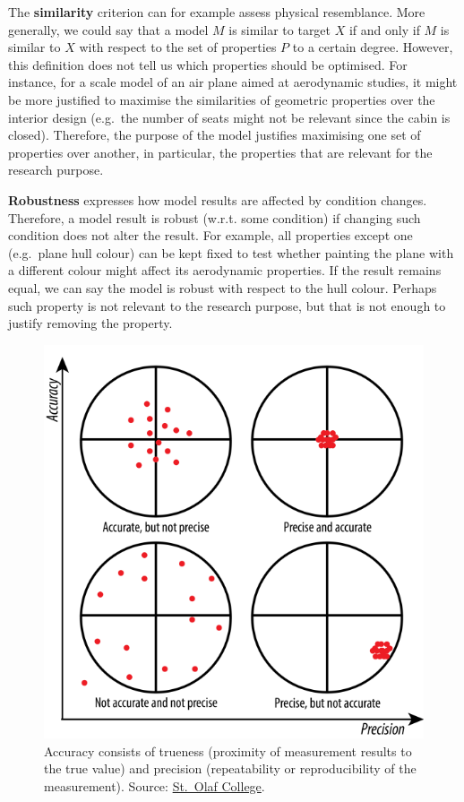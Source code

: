 \documentclass[
]{book}
\begin{document}
The \textbf{similarity} criterion can for example assess physical resemblance. More generally, we could say that a model \(M\) is similar to target \(X\) if and only if \(M\) is similar to \(X\) with respect to the set of properties \(P\) to a certain degree. However, this definition does not tell us which properties should be optimised. For instance, for a scale model of an air plane aimed at aerodynamic studies, it might be more justified to maximise the similarities of geometric properties over the interior design (e.g.~the number of seats might not be relevant since the cabin is closed). Therefore, the purpose of the model justifies maximising one set of properties over another, in particular, the properties that are relevant for the research purpose.

\textbf{Robustness} expresses how model results are affected by condition changes. Therefore, a model result is robust (w.r.t. some condition) if changing such condition does not alter the result. For example, all properties except one (e.g.~plane hull colour) can be kept fixed to test whether painting the plane with a different colour might affect its aerodynamic properties. If the result remains equal, we can say the model is robust with respect to the hull colour. Perhaps such property is not relevant to the research purpose, but that is not enough to justify removing the property.



\begin{figure}

{\centering \includegraphics[width=0.66\linewidth]{Figures/prec_vs_acc} 

}

\caption{Accuracy consists of trueness (proximity of measurement results to the true value) and precision (repeatability or reproducibility of the measurement). Source: \href{https://wp.stolaf.edu/it/gis-precision-accuracy/}{St.~Olaf College}.}\label{fig:prec-vs-acc}
\end{figure}
\end{document}
